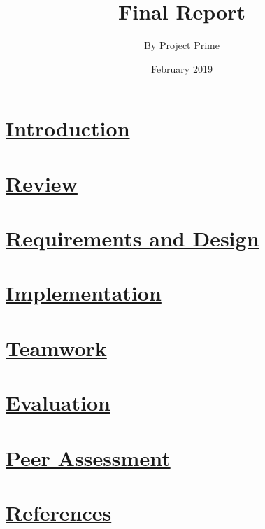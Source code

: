 \documentclass{article}
\title{Final Report}
\author{By Project Prime}
\date{February 2019}
\begin{document}
   \maketitle
 	\section{\underline{Introduction}}

	\section{\underline{Review}}

	\section{\underline{Requirements and Design}}

	\section{\underline{Implementation}}
	
	\section{\underline{Teamwork}}

	\section{\underline{Evaluation}}

	\section{\underline{Peer Assessment}}

	\section{\underline{References}}
\end{document}
